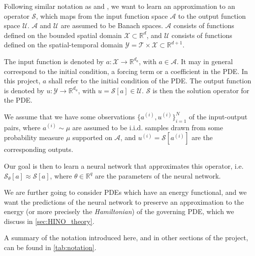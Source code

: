 Following similar notation as  and , we want to learn an approximation to an operator \(\mathcal{S}\), which maps from the input function space \(\mathcal{A}\) to the output function space \(\mathcal{U}\).
\(\mathcal{A}\) and \(\mathcal{U}\) are assumed to be Banach spaces. \(\mathcal{A}\) consists of functions defined on the bounded spatial domain \(\mathcal{X} \subset \mathbb{R}^d \), and \(\mathcal{U}\) consists of functions defined on the spatial-temporal domain \(\mathcal{Y} = \mathcal{T} \times \mathcal{X} \subset \mathbb{R}^{d+1}\). 

The input function is denoted by \(a : \mathcal{X} \to \mathbb{R}^{d_a}\), with \(a \in \mathcal{A}\). It may in general correspond to the initial condition, a forcing term or a coefficient in the PDE. In this project, \(a\) shall refer to the initial condition of the PDE. 
The output function is denoted by \(u: \mathcal{Y} \to \mathbb{R}^{d_u}\), with \(u = \mathcal{S}[a]  \in \mathcal{U}\). \(\mathcal{S}\) is then the solution operator for the PDE.

We assume that we have some observations \(\{a^{(i)}, u^{(i)}\}_{i=1}^N\) of the input-output pairs, where \(a^{(i)} \sim \mu\) are assumed to be i.i.d. samples drawn from some probability measure \(\mu\) supported on \(\mathcal{A}\), and \(u^{(i)} = \mathcal{S}[a^{(i)}]\) are the corresponding outputs.

Our goal is then to learn a neural network that approximates this operator, i.e. \(\mathcal{S}_\theta[a] \approx \mathcal{S}[a]\), where \(\theta \in \mathbb{R}^q\) are the parameters of the neural network.

We are further going to consider PDEs which have an energy functional, and we want the predictions of the neural network to preserve an approximation to the energy (or more precisely the \textit{Hamiltonian}) of the governing PDE, which we discuss in \cref{sec:HINO_theory}.

A summary of the notation introduced here, and in other sections of the project, can be found in \cref{tab:notation}.